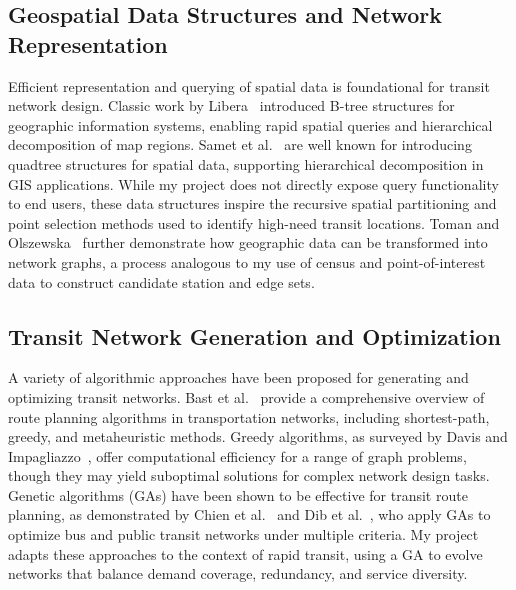 \documentclass[sigconf,nonacm]{acmart}
\begin{document}
\subsection{Geospatial Data Structures and Network Representation}
Efficient representation and querying of spatial data is foundational for transit network design. Classic work by Libera~\cite{libera1986using} introduced B-tree structures for geographic information systems, enabling rapid spatial queries and hierarchical decomposition of map regions. Samet et al.~\cite{samet1984geographic} are well known for introducing quadtree structures for spatial data, supporting hierarchical decomposition in GIS applications. While my project does not directly expose query functionality to end users, these data structures inspire the recursive spatial partitioning and point selection methods used to identify high-need transit locations. Toman and Olszewska~\cite{toman2014algorithm} further demonstrate how geographic data can be transformed into network graphs, a process analogous to my use of census and point-of-interest data to construct candidate station and edge sets.

\subsection{Transit Network Generation and Optimization}
A variety of algorithmic approaches have been proposed for generating and optimizing transit networks. Bast et al.~\cite{bast2016route} provide a comprehensive overview of route planning algorithms in transportation networks, including shortest-path, greedy, and metaheuristic methods. Greedy algorithms, as surveyed by Davis and Impagliazzo~\cite{davis2007models}, offer computational efficiency for a range of graph problems, though they may yield suboptimal solutions for complex network design tasks. Genetic algorithms (GAs) have been shown to be effective for transit route planning, as demonstrated by Chien et al.~\cite{chien2001genetic} and Dib et al.~\cite{dib2017advanced}, who apply GAs to optimize bus and public transit networks under multiple criteria. My project adapts these approaches to the context of rapid transit, using a GA to evolve networks that balance demand coverage, redundancy, and service diversity.
\end{document}
